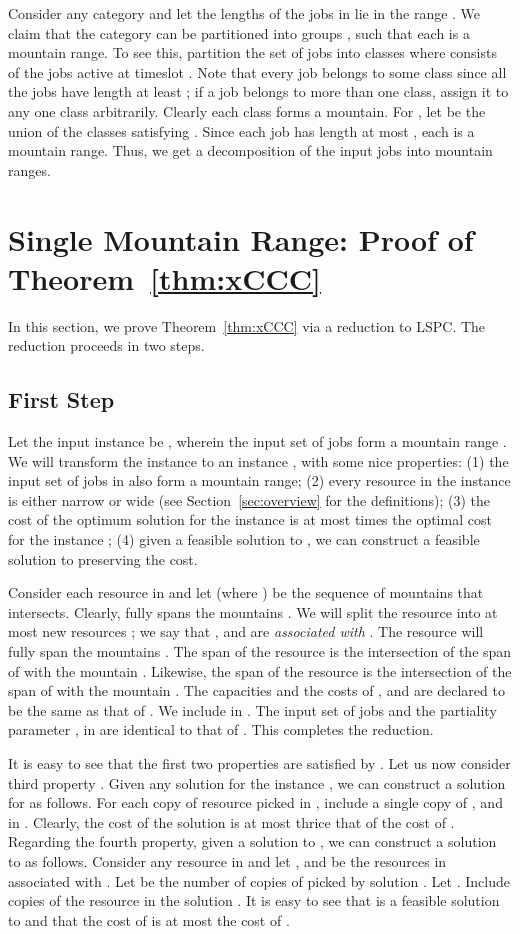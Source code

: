 \documentclass[11pt]{article}
\newcommand{\qed} {\hfill}
\newcommand{\lspc}{{\sc LSPC}}
\begin{document}
Consider any category  and let the lengths of the jobs in  lie in the range .
We claim that the category  can be partitioned into  groups , such that 
each  is a mountain range. 
To see this, 
partition the set of jobs  into classes  where  consists of the jobs
active at timeslot .
Note that every job belongs to some class since all the jobs have
length at least ; if a job belongs to more than one class, assign it to any one class arbitrarily.
Clearly each class  forms a mountain. 
For , let  be the union of the classes  satisfying .
Since each job has length at most , each  is a mountain range.
Thus, we get a decomposition of the input jobs into  mountain ranges.
\qed

\section{Single Mountain Range: Proof of Theorem~\ref{thm:xCCC}}
\label{app:red}
In this section, we prove Theorem~\ref{thm:xCCC} via a reduction to {\lspc}. 
The reduction proceeds in two steps. 

\subsection{First Step}
Let the input instance be , wherein the input set of jobs form a mountain range . We will transform the instance  to an instance , with some nice properties:
(1) the input set of jobs in  also form a mountain range;
(2) every resource  in the instance  is either narrow or wide (see Section~\ref{sec:overview} for the definitions);
(3) the cost of the optimum solution for the instance  is at most  times the optimal cost for
the instance ;
(4) given a feasible solution to , we can construct a feasible solution to  preserving the cost. 

Consider each resource  in  and let  (where ) be the sequence of mountains that  intersects. Clearly,  fully spans the mountains . 
We will split the resource  into at most  new resources ; we say that ,  and  
are {\em associated with} .
The resource  will fully span the mountains .
The span of the resource  is the intersection of the span of   with the mountain . Likewise, the span of the resource  is the intersection of the span of  with the 
mountain .
The capacities and the costs of ,  and  are declared to be the same as that 
of . We include  in . 
The input set of jobs and the partiality parameter , in  are identical to that of . 
This completes the reduction.

It is easy to see that the first two properties are satisfied by .
Let us now consider third property .
Given any solution  for the instance , we can construct a solution  for  as follows. 
For each copy of resource  picked in , include a single copy of ,  and  in . 
Clearly, the cost of the solution  is at most thrice that of the cost of .
Regarding the fourth property, given a solution  to , we can construct a solution  to 
as follows. Consider any resource  in  and let ,  and  be the resources in 
associated with . Let  be the number of copies of  picked by solution .
Let . Include  copies of the resource  in the solution .
It is easy to see that  is a feasible solution to  and that the cost of  is
at most the cost of .
\end{document}
